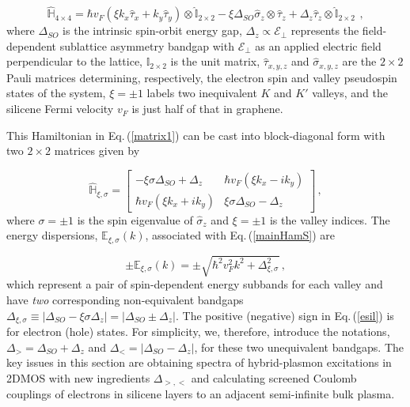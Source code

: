 \documentclass[aps,prb,showpacs]{revtex4}
\newcommand{\mbb}{\mathbb}
\newcommand{\mc}{\mathcal}
\begin{document}
\begin{equation}
\hat{\mbb{H}}_{4\times 4} = \hbar v_F \left( 
\xi k_x \hat{\tau}_x + k_y \hat{\tau}_y
\right) \otimes \hat{\mbb{I}}_{2\times 2} - \xi \Delta_{SO} \hat{\sigma}_z \otimes \hat{\tau}_z +
\Delta_z \hat{\tau}_z \otimes \hat{\mbb{I}}_{2\times 2}\,\ ,
\label{matrix1}
\end{equation}
where $\Delta_{SO}$ is the intrinsic spin-orbit energy gap, $\Delta_z\propto\mc{E}_\bot$ represents the field-dependent sublattice asymmetry bandgap with $\mc{E}_\bot$ as an applied electric field perpendicular 
to the lattice, $\hat{\mbb{I}}_{2\times 2}$ is the unit matrix, $\hat{\tau}_{x,y,z}$ and $\hat{\sigma}_{x,y,z}$ are the $2\times 2$ Pauli matrices determining, respectively, the
electron spin and valley pseudospin states of the system, $\xi = \pm 1$ labels two inequivalent $K$ and $K'$ valleys, and the silicene Fermi velocity $v_F$ is just half of that in graphene.
\medskip

This Hamiltonian in Eq.\,(\ref{matrix1}) can be cast into block-diagonal form with two $2\times 2$ matrices given by

\begin{equation}
\hat{\mbb{H}}_{\xi,\sigma} = \left[\begin{matrix}
- \xi \sigma \Delta_{SO} + \Delta_z & \hbar v_F (\xi k_x - i k_y) \\
\hbar v_F (\xi k_x + i k_y) & \xi \sigma \Delta_{SO} - \Delta_z 
\end{matrix}\right]\, ,
\label{mainHamS}
\end{equation}
where $\sigma=\pm 1$ is the spin eigenvalue of $\hat{\sigma}_z$ and $\xi=\pm 1$ is the valley indices. The energy dispersions, $\mbb{E}_{\xi,\sigma}(k)$, associated with Eq.\,(\ref{mainHamS}) are 

\begin{equation}
\pm\mbb{E}_{\xi,\sigma}(k) = \pm \sqrt{
\hbar^2 v_F^2k^2+\Delta_{\xi,\sigma}^2}\, ,
\label{esil}
\end{equation}
which represent a pair of spin-dependent energy subbands for each valley and have \textit{two} corresponding
non-equivalent bandgaps $\Delta_{\xi,\sigma} \equiv \vert \Delta_{SO} - \xi \sigma \Delta_z \vert = \vert \Delta_{SO} \pm \Delta_z \vert $. 
The positive (negative) sign in Eq.\,(\ref{esil}) is for electron (hole) states. For simplicity, we, therefore,
introduce the notations, $\Delta_{>}  = \Delta_{SO}+\Delta_z $ and 
$\Delta_{<} = \vert \Delta_{SO} - \Delta_z \vert $, for these two unequivalent bandgaps.
The key issues in this section are obtaining spectra of hybrid-plasmon excitations in 2DMOS with new ingredients $\Delta_{>,<}$
and calculating screened Coulomb couplings of electrons in silicene layers to 
an adjacent semi-infinite bulk plasma.
\medskip
\end{document}
